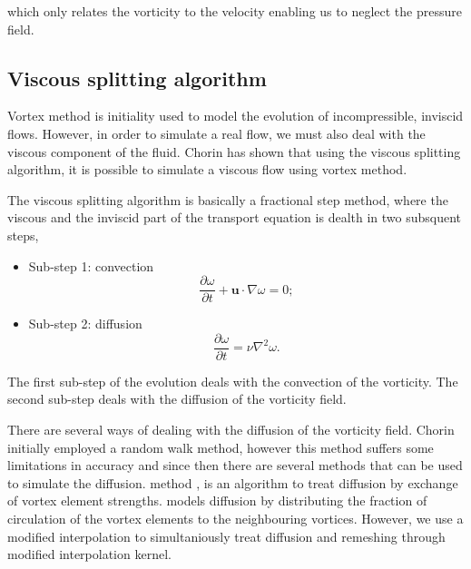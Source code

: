 which only relates the vorticity to the velocity enabling us to neglect the pressure field.


\subsection{Viscous splitting algorithm}
Vortex method is initiality used to model the evolution of incompressible, inviscid flows. However, in order to simulate a real flow, we must also deal with the viscous component of the fluid. Chorin \cite{Chorin1973} has shown that using the viscous splitting algorithm, it is possible to simulate a viscous flow using vortex method. 

The viscous splitting algorithm is basically a fractional step method, where the viscous and the inviscid part of the transport equation is dealth in two subsquent steps, 

\begin{itemize}
\item Sub-step 1: convection
\begin{equation}
\frac{\partial\omega}{\partial t} + \mathbf{u}\cdot\nabla\omega=0;
\label{eq:convectionEulerian}
\end{equation}
\item Sub-step 2: diffusion
\begin{equation}
\frac{\partial\omega}{\partial t} = \nu\nabla^2\omega.
\end{equation}

\end{itemize}

The first sub-step of the evolution deals with the convection of the vorticity. The second sub-step deals with the diffusion of the vorticity field. 

There are several ways of dealing with the diffusion of the vorticity field. Chorin initially employed a random walk method, however this method suffers some limitations in accuracy and since then there are several methods that can be used to simulate the diffusion.  method \cite{Degond1989}, is an algorithm to treat diffusion by exchange of vortex element strengths.  \cite{Shankar1996} models diffusion by distributing the fraction of circulation of the vortex elements to the neighbouring vortices. However, we use a modified interpolation \cite{Wee2006} to simultaniously treat diffusion and remeshing through modified interpolation kernel. 

